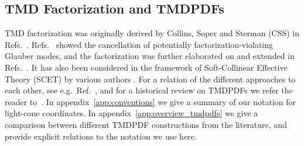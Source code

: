 \documentclass[11pt,a4paper]{article}
\DeclareRobustCommand{\app}[1]{appendix~\ref{app:#1}}
\DeclareRobustCommand{\mycite}[1]{Ref.~\cite{#1}}
\DeclareRobustCommand{\mycites}[1]{Refs.~\cite{#1}}
\begin{document}
\subsection{TMD Factorization and TMDPDFs}
\label{sec:tmd_factorization}

TMD factorization was originally derived by Collins, Soper and Sterman (CSS)
in \mycites{Collins:1981uk,Collins:1981va,Collins:1984kg}.
\mycites{Collins:1985ue,Collins:1988ig,Collins:1989gx,Collins:1350496,Diehl:2015bca} showed the cancellation of potentially factorization-violating Glauber modes,
and the factorization was further elaborated on and extended
in \mycites{Catani:2000vq,deFlorian:2001zd,Catani:2010pd,Collins:1350496}.
It has also been considered in the framework of Soft-Collinear Effective Theory (SCET)
\cite{Bauer:2000ew, Bauer:2000yr, Bauer:2001ct, Bauer:2001yt}
by various authors \cite{Becher:2010tm, Becher:2011xn, Becher:2012yn, GarciaEchevarria:2011rb, Echevarria:2012js, Echevarria:2014rua, Chiu:2012ir}.
For a relation of the different approaches to each other, see e.g.~\mycite{Collins:2017oxh}, and for a historical review on TMDPDFs we refer the reader to~\cite{Collins:1350496}.
In \app{conventions} we give a summary of our notation for light-cone coordinates. 
In \app{overview_tmdpdfs} we give a comparison between different TMDPDF constructions from the literature, and provide explicit relations to the notation we use here.
\end{document}

